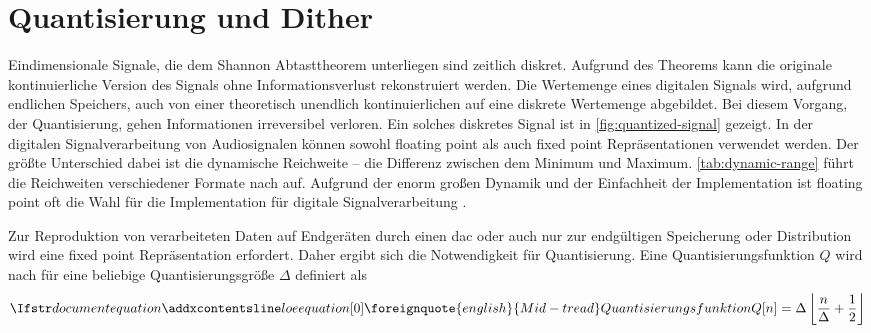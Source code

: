 
\cleartoleftpage

\thispagestyle{empty}
\vspace*{\fill}
\newpage

\onehalfspacing
{}
\setcounter{page}{1}
\pagestyle{scrheadings}

\section{Quantisierung und Dither}

Eindimensionale Signale, die dem Shannon Abtasttheorem \autocite{shannon} unterliegen sind zeitlich diskret.
Aufgrund des Theorems kann die originale kontinuierliche Version des Signals ohne Informationsverlust rekonstruiert werden.
Die Wertemenge eines digitalen Signals wird, aufgrund endlichen Speichers, auch von einer theoretisch unendlich kontinuierlichen auf eine diskrete Wertemenge abgebildet.
Bei diesem Vorgang, der Quantisierung, gehen Informationen irreversibel verloren.
Ein solches diskretes Signal ist in \autoref{fig:quantized-signal} gezeigt.
In der digitalen Signalverarbeitung von Audiosignalen können sowohl \gls{floating point} als auch \gls{fixed point} Repräsentationen verwendet werden.
Der größte Unterschied dabei ist die dynamische Reichweite -- die Differenz zwischen dem Minimum und Maximum.
\autoref{tab:dynamic-range} führt die Reichweiten verschiedener Formate nach \citeauthor{dsp-guide} auf.
Aufgrund der enorm großen Dynamik und der Einfachheit der Implementation ist \gls{floating point} oft die Wahl für die Implementation für digitale Signalverarbeitung \autocite[S. 68ff]{dsp-guide}.

Zur Reproduktion von verarbeiteten Daten auf Endgeräten durch einen \gls{dac} oder auch nur zur endgültigen Speicherung oder Distribution wird eine \gls{fixed point} Repräsentation erfordert.
Daher ergibt sich die Notwendigkeit für Quantisierung.
Eine Quantisierungsfunktion $Q$ wird nach \citeauthor{dither} für eine beliebige Quantisierungsgröße $\Delta$ definiert als
\begin{equation}
    \setequationentry{\foreignquote{english}{Mid-tread} Quantisierungsfunktion}
    Q[n] = \Delta \left\lfloor \frac{n}{\Delta} + \frac{1}{2} \right\rfloor
\end{equation}

